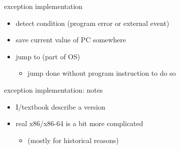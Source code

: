 \begin{frame}{exception implementation}
\begin{itemize}
\item detect condition (program error or external event)
\item save current value of PC somewhere
\item jump to  (part of OS)
    \begin{itemize}
    \item jump done without program instruction to do so
    \end{itemize}
\end{itemize}
\end{frame}

\begin{frame}{exception implementation: notes}
\begin{itemize}
\item I/textbook describe a  version
\item real x86/x86-64 is a bit more complicated
    \begin{itemize}
    \item (mostly for historical reasons)
    \end{itemize}
\end{itemize}
\end{frame}

